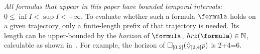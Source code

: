 \textit{All formulas that appear in this paper have bounded temporal intervals: $ 0\leq \inf I < \sup I < +\infty$.}
To evaluate whether such a formula $\formula$ holds on a given trajectory, only a finite-length prefix of that trajectory is needed.
Its length can be upper-bounded by the \textit{horizon} of $\formula$, $hrz(\formula) \in \Ne$, calculable as shown in~\cite{Dokhanchi14_OnlineMonitoring}. 
For example, the horizon of $\square_{[0,2]}(\Diamond_{[2,4]}p)$ is 2+4=6.

